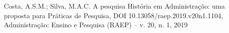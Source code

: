 \documentclass[
12pt,		%
openright,	%
twoside,  %
a4paper,			%
chapter=TITLE,		%
english,			%
french,				%
spanish,			%
brazil				%
]{USPSC-classe/USPSC}
\begin{document}
\begin{flushleft}
\begin{flushleft}
\begin{flushleft}
\begin{flushleft}
\begin{flushleft}
\begin{flushleft}
\begin{flushleft}
\begin{flushleft}
\begin{flushleft}
\begin{flushleft}
 Costa, A.S.M.; Silva, M.A.C. A pesquisa Hist\'oria em Administra\c{c}\~ao: uma proposta para Pr\'aticas de Pesquisa, DOI 10.13058/raep.2019.v20n1.1104, Administra\c{c}\~ao: Ensino e Pesquisa (RAEP) – v. 20, n. 1, 2019
\end{flushleft}


\end{flushleft}


\end{flushleft}


\end{flushleft}


\end{flushleft}


\end{flushleft}


\end{flushleft}


\end{flushleft}


\end{flushleft}


\end{flushleft}
\end{document}
